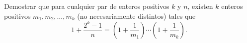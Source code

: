 Demostrar que para cualquier par de enteros positivos $k$ y $n$, existen $k$ enteros positivos $m_1, m_2, \dots , m_k$ (no necesariamente distintos) tales que
\[1+\frac{2^k-1}{n}=\left(1+\frac1{m_1}\right)\cdots \left(1+\frac1{m_k}\right).\]

